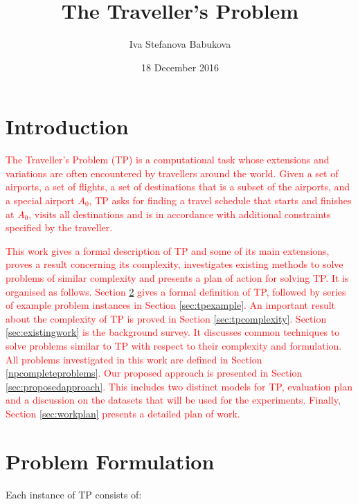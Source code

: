 \documentclass{mprop}
\theoremstyle{definition}
\begin{document}
\title{The Traveller's Problem}
\author{Iva Stefanova Babukova}
\date{18 December 2016}
\maketitle
\tableofcontents
\educationalconsent
\newpage

\section{Introduction}\label{intro}
\textcolor{red}{
The Traveller’s Problem (TP) is a computational task whose extensions and variations are often encountered by travellers around the world.
Given a set of airports, a set of flights, a set of destinations that is a subset of the airports, and a special airport $A_{0}$, TP asks for finding a travel schedule that starts and finishes at $A_{0}$, visits all destinations and is in accordance with additional constraints specified by the traveller.}

\textcolor{red}{This work gives a formal description of TP and some of its main extensions, proves a result concerning its complexity, investigates existing methods to solve problems of similar complexity and presents a plan of action for solving TP.
It is organised as follows. Section \ref{sec:tpformulation} gives a formal definition of TP, followed by series of example problem instances in Section \ref{sec:tpexample}. An important result about the complexity of TP is proved in Section \ref{sec:tpcomplexity}. Section \ref{sec:existingwork} is the background survey. It discusses common techniques to solve problems similar to TP with respect to their complexity and formulation. All problems investigated in this work are defined in Section \ref{npcompleteproblems}. Our proposed approach is presented in Section \ref{sec:proposedapproach}. This includes two distinct models for TP, evaluation plan and a discussion on the datasets that will be used for the experiments. Finally, Section \ref{sec:workplan} presents a detailed plan of work.}

\section{Problem Formulation}
\label{sec:tpformulation}

Each instance of TP consists of:
\end{document}
